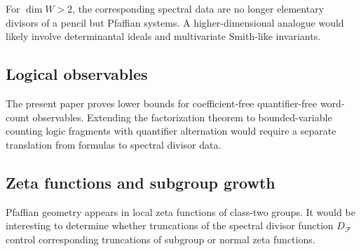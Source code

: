 \documentclass[11pt]{article}
\begin{document}
For $\dim W>2$, the corresponding spectral data are no longer elementary divisors of a pencil but Pfaffian systems. A higher-dimensional analogue would likely involve determinantal ideals and multivariate Smith-like invariants.

\subsection{Logical observables}

The present paper proves lower bounds for coefficient-free quantifier-free word-count observables. Extending the factorization theorem to bounded-variable counting logic fragments with quantifier alternation would require a separate translation from formulas to spectral divisor data.

\subsection{Zeta functions and subgroup growth}

Pfaffian geometry appears in local zeta functions of class-two groups. It would be interesting to determine whether truncations of the spectral divisor function $D_{\mathcal F}$ control corresponding truncations of subgroup or normal zeta functions.
\end{document}
